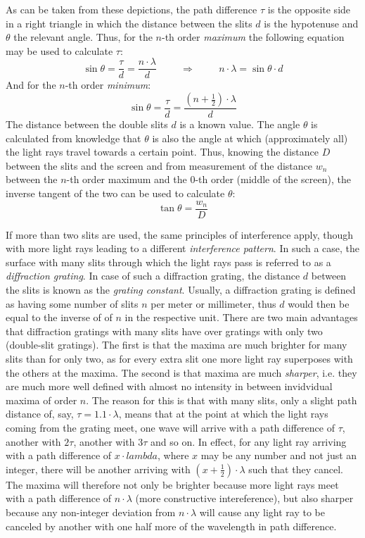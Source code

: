As can be taken from these depictions, the path difference $\tau$ is the opposite side in a right triangle in which the distance between the slits $d$ is the hypotenuse and $\theta$ the relevant angle. Thus, for the $n$-th order \emph{maximum} the following equation may be used to calculate $\tau$: $$\sin \theta = \frac{\tau}{d} = \frac{n \cdot \lambda}{d} \hspace{1cm} \Rightarrow \hspace{1cm} n \cdot \lambda = \sin \theta \cdot d$$ And for the $n$-th order \emph{minimum}: $$\sin \theta = \frac{\tau}{d} = \frac{(n + \frac{1}{2}) \cdot \lambda}{d}$$ The distance between the double slits $d$ is a known value. The angle $\theta$ is calculated from knowledge that $\theta$ is also the angle at which (approximately all) the light rays travel towards a certain point. Thus, knowing the distance $D$ between the slits and the screen and from measurement of the distance $w_n$ between the $n$-th order maximum and the $0$-th order (middle of the screen), the inverse tangent of the two can be used to calculate $\theta$: $$\tan \theta = \frac{w_n}{D}$$

If more than two slits are used, the same principles of interference apply, though with more light rays leading to a different \emph{interference pattern}. In such a case, the surface with many slits through which the light rays pass is referred to as a \emph{diffraction grating}. In case of such a diffraction grating, the distance $d$ between the slits is known as the \emph{grating constant}. Usually, a diffraction grating is defined as having some number of slits $n$ per meter or millimeter, thus $d$ would then be equal to the inverse of of $n$ in the respective unit. There are two main advantages that diffraction gratings with many slits have over gratings with only two (double-slit gratings). The first is that the maxima are much brighter for many slits than for only two, as for every extra slit one more light ray superposes with the others at the maxima. The second is that maxima are much \emph{sharper}, i.e. they are much more well defined with almost no intensity in between invidvidual maxima of order $n$. The reason for this is that with many slits, only a slight path distance of, say, $\tau = 1.1 \cdot \lambda$, means that at the point at which the light rays coming from the grating meet, one wave will arrive with a path difference of $\tau$, another with $2 \tau$, another with $3 \tau$ and so on. In effect, for any light ray arriving with a path difference of $x \cdot lambda$, where $x$ may be any number and not just an integer, there will be another arriving with $(x + \frac{1}{2}) \cdot \lambda$ such that they cancel. The maxima will therefore not only be brighter because more light rays meet with a path difference of $n \cdot \lambda$ (more constructive intereference), but also sharper because any non-integer deviation from $n \cdot \lambda$ will cause any light ray to be canceled by another with one half more of the wavelength in path difference.

